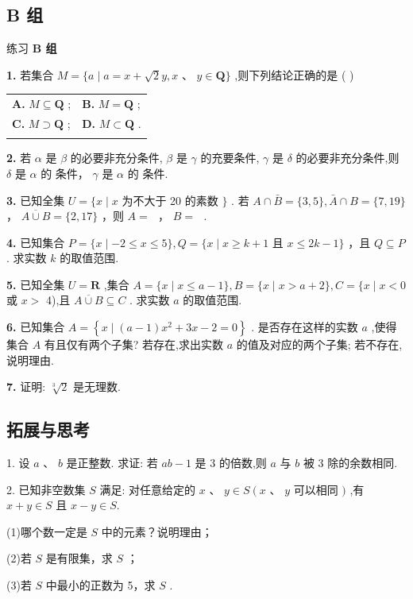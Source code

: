 \documentclass[a4paper,10pt,oneside,fontset=none]{ctexbook}
\renewcommand{\geq}{\geqslant}
\renewcommand{\leq}{\leqslant}
\newcommand{\fillin}[1][2cm]{\,\underline{\hspace{#1}}\,}
\newenvironment{exercise}[1][]{\begin{exBox}{练习}{#1}}{\end{exBox}}
\numberwithin{equation}{chapter}
\begin{document}
\subsection*{B 组}

\begin{exercise}
\textbf{B 组}\par\vspace{0.5em}
\textbf{1.} 若集合 $M = \{ a \mid  a = x + \sqrt{2}y, x\text{ 、 }y \in  \mathbf{Q}\}$ ,则下列结论正确的是 ( )
\par\vspace{0.3em}
\begin{center}
\begin{tabular}{@{}p{}p{}@{}}
\textbf{A.} $M \subseteq  \mathbf{Q}$ ; & \textbf{B.} $M = \mathbf{Q}$ ; \\\vspace{0.2em}
\textbf{C.} $M \supset  \mathbf{Q}$ ; & \textbf{D.} $M \subset  \mathbf{Q}$ . \\\vspace{0.2em}
\end{tabular}
\end{center}
\par\vspace{0.8em}
\textbf{2.} 若 $\alpha$ 是 $\beta$ 的必要非充分条件, $\beta$ 是 $\gamma$ 的充要条件, $\gamma$ 是 $\delta$ 的必要非充分条件,则 $\delta$ 是 $\alpha$ 的\fillin[2cm]条件， $\gamma$ 是 $\alpha$ 的\fillin[2cm]条件.
\par\vspace{0.8em}
\textbf{3.} 已知全集 $U = \{ x \mid  x$ 为不大于 20 的素数 $\}$ . 若 $A \cap  \bar{B} = \{ 3,5\} ,\bar{A} \cap  B = \{ 7,{19}\}$ ， $\overline{A \cup  B} = \{ 2,{17}\}$ ，则 $A =$ \fillin[2cm]， $B =$ \fillin[2cm].
\par\vspace{0.8em}
\textbf{4.} 已知集合 $P = \{ x \mid   - 2 \leq  x \leq  5\} , Q = \{ x \mid  x \geq  k + 1$ 且 $x \leq  {2k} - 1\}$ ，且 $Q \subseteq  P$ . 求实数 $k$ 的取值范围.
\par\vspace{0.8em}
\textbf{5.} 已知全集 $U = \mathbf{R}$ ,集合 $A = \{ x \mid  x \leq  a - 1\} , B = \{ x \mid  x > a + 2\} , C = \{ x \mid  x < 0$ 或 $x >$ 4),且 $\overline{A \cup  B} \subseteq  C$ . 求实数 $a$ 的取值范围.
\par\vspace{0.8em}
\textbf{6.} 已知集合 $A = \left\{  {x \mid  \left( {a - 1}\right) {x}^{2} + {3x} - 2 = 0}\right\}$ . 是否存在这样的实数 $a$ ,使得集合 $A$ 有且仅有两个子集? 若存在,求出实数 $a$ 的值及对应的两个子集; 若不存在,说明理由.
\par\vspace{0.8em}
\textbf{7.} 证明: $\sqrt[3]{2}$ 是无理数.
\end{exercise}

\subsection*{拓展与思考}

1. 设 $a\text{ 、 }b$ 是正整数. 求证: 若 ${ab} - 1$ 是 3 的倍数,则 $a$ 与 $b$ 被 3 除的余数相同.

2. 已知非空数集 $S$ 满足: 对任意给定的 $x\text{ 、 }y \in  S\left( {x\text{ 、 }y}\right.$ 可以相同 $)$ ,有 $x + y \in  S$ 且 $x - y \in  S.$

(1)哪个数一定是 $S$ 中的元素？说明理由；

(2)若 $S$ 是有限集，求 $S$ ；

(3)若 $S$ 中最小的正数为 5，求 $S$ .
\end{document}
